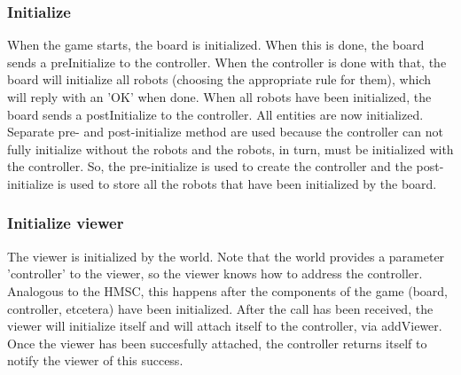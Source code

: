 	\subsubsection{Initialize}
	\begin{minipage}{\linewidth}
		When the game starts, the board is initialized. When this is done, the board sends a preInitialize to the controller. When the controller is done with that, the board will initialize all robots (choosing the appropriate rule for them), which will reply with an 'OK' when done. When all robots have been initialized, the board sends a postInitialize to the controller. All entities are now initialized. \\
	Separate pre- and post-initialize method are used because the controller can not fully initialize without the robots and the robots, in turn, must be initialized with the controller. So, the pre-initialize is used to create the controller and the post-initialize is used to store all the robots that have been initialized by the board.

		
    \end{minipage}

    \subsubsection{Initialize viewer}
	\begin{minipage}{\linewidth}
		The viewer is initialized by the world. Note that the world provides a parameter 'controller' to the viewer, so the viewer knows how to address the controller. Analogous to the HMSC, this happens after the components of the game (board, controller, etcetera) have been initialized. After the call has been received, the viewer will initialize itself and will attach itself to the controller, via addViewer. Once the viewer has been succesfully attached, the controller returns itself to notify the viewer of this success.
	
		
	\end{minipage}

